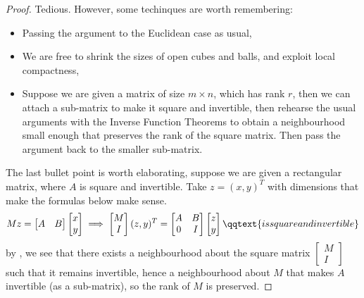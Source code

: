\documentclass[../main-v2-manifolds.tex]{subfiles}
\begin{document}
\begin{proof}
    Tedious. However, some techinques are worth remembering:
    \begin{itemize}
        \item Passing the argument to the Euclidean case as usual,
        \item We are free to shrink the sizes of open cubes and balls, and exploit local compactness,
        \item Suppose we are given a matrix of size $m\times n$, which has rank $r$, then we can attach a sub-matrix to make it square and invertible, then rehearse the usual arguments with the Inverse Function Theorems  to obtain a neighbourhood small enough that preserves the rank of the square matrix. Then pass the argument back to the smaller sub-matrix.
    \end{itemize}
    The last bullet point is worth elaborating, suppose we are given a rectangular matrix, where $A$ is square and invertible. Take $z = (x,y)^T$ with dimensions that make the formulas below make sense.
    \[
        Mz = \begin{bmatrix}
            A & B
        \end{bmatrix}\begin{bmatrix}
            x\\ y
        \end{bmatrix}\implies \begin{bmatrix}
            M\\ I
        \end{bmatrix}(z,y)^T = \begin{bmatrix}
            A & B\\ 0 & I
        \end{bmatrix}\begin{bmatrix}
            z\\ y
        \end{bmatrix}\qqtext{is square and invertible}
    \]
    by , we see that there exists a neighbourhood about the square matrix $\begin{bmatrix} M\\ I\end{bmatrix}$ such that it remains invertible, hence a neighbourhood about $M$ that makes $A$ invertible (as a sub-matrix), so the rank of $M$ is preserved.
\end{proof}
\end{document}
